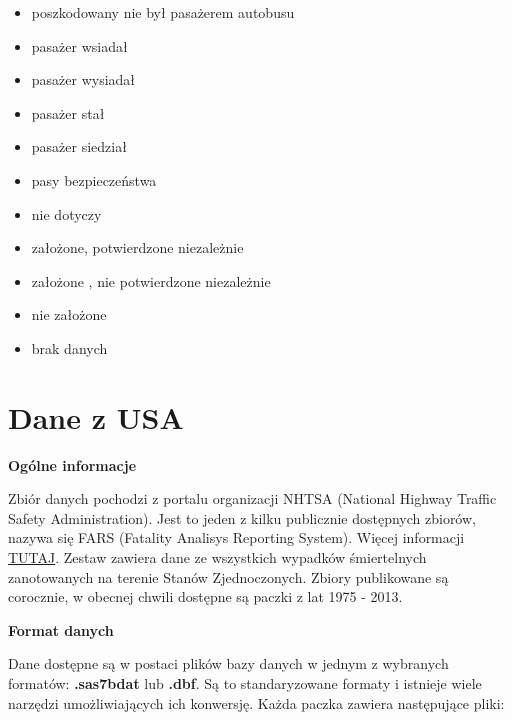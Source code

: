 \begin{itemize}
\item
  poszkodowany nie był pasażerem autobusu\\
\item
  pasażer wsiadał\\
\item
  pasażer wysiadał\\
\item
  pasażer stał\\
\item
  pasażer siedział\\
\item
  pasy bezpieczeństwa\\
\item
  nie dotyczy\\
\item
  założone, potwierdzone niezależnie\\
\item
  założone , nie potwierdzone niezależnie\\
\item
  nie założone\\
\item
  brak danych
\end{itemize}

\section{Dane z USA}\label{dane-z-usa}

\textbf{Ogólne informacje}

Zbiór danych pochodzi z portalu organizacji NHTSA (National Highway
Traffic Safety Administration). Jest to jeden z kilku publicznie
dostępnych zbiorów, nazywa się FARS (Fatality Analisys Reporting
System). Więcej informacji \href{http://www.nhtsa.gov/FARS}{TUTAJ}.
Zestaw zawiera dane ze wszystkich wypadków śmiertelnych zanotowanych na
terenie Stanów Zjednoczonych. Zbiory publikowane są corocznie, w obecnej
chwili dostępne są paczki z lat 1975 - 2013.

\textbf{Format danych}

Dane dostępne są w postaci plików bazy danych w jednym z wybranych
formatów: \textbf{.sas7bdat} lub \textbf{.dbf}. Są to standaryzowane
formaty i istnieje wiele narzędzi umożliwiających ich konwersję. Każda
paczka zawiera następujące pliki:

